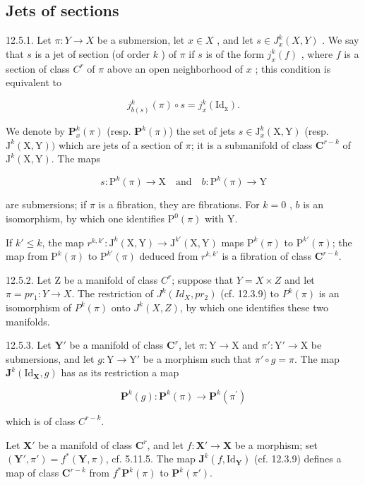 \subsection{Jets of sections}

12.5.1. Let \(\pi: Y \to X\) be a submersion, let \(x \in X\) , and let \(s \in J_x^k(X, Y)\) . We say that \(s\) is a jet of section (of order \(k\) ) of \(\pi\) if \(s\) is of the form \(j_x^k(f)\) , where \(f\) is a section of class \(C^r\) of \(\pi\) above an open neighborhood of \(x\) ; this condition is equivalent to

\[
j _ {b (s)} ^ {k} (\pi) \circ s = j _ {x} ^ {k} (\mathrm{Id} _ {\mathrm{x}}).
\]

We denote by \(\mathbf{P}_x^k (\pi)\) (resp. \(\mathbf{P}^k (\pi)\)) the set of jets \(s\in \mathrm{J}_x^k (\mathrm{X},\mathrm{Y})\) (resp. \(\mathrm{J}^k (\mathrm{X},\mathrm{Y}))\) which are jets of a section of \(\pi\); it is a submanifold of class \(\mathbf{C}^{r - k}\) of \(\mathrm{J}^k (\mathrm{X},\mathrm{Y})\). The maps

\[
s \colon \mathrm{P} ^ {k} (\pi) \rightarrow \mathrm{X} \quad \text {and} \quad b \colon \mathrm{P} ^ {k} (\pi) \rightarrow \mathrm{Y}
\]

are submersions; if \(\pi\) is a fibration, they are fibrations. For \(k=0\) , \(b\) is an isomorphism, by which one identifies \(\mathrm{P}^{0}(\pi)\) with Y.

If \(k' \leqslant k\), the map \(r^{k, k'} : \mathrm{J}^k(\mathrm{X}, \mathrm{Y}) \to \mathrm{J}^{k'}(\mathrm{X}, \mathrm{Y})\) maps \(\mathrm{P}^k(\pi)\) to \(\mathrm{P}^{k'}(\pi)\); the map from \(\mathrm{P}^k(\pi)\) to \(\mathrm{P}^{k'}(\pi)\) deduced from \(r^{k, k'}\) is a fibration of class \(\mathbf{C}^{r-k}\).

12.5.2. Let Z be a manifold of class \(C^{r}\); suppose that \(Y = X \times Z\) and let \(\pi = pr_{1}: Y \to X\). The restriction of \(J^{k}(Id_{X}, pr_{2})\) (cf. 12.3.9) to \(P^{k}(\pi)\) is an isomorphism of \(P^{k}(\pi)\) onto \(J^{k}(X, Z)\), by which one identifies these two manifolds.

12.5.3. Let \(\mathbf{Y}'\) be a manifold of class \(\mathbf{C}^{r}\), let \(\pi: \mathrm{Y} \to \mathrm{X}\) and \(\pi': \mathrm{Y}' \to \mathrm{X}\) be submersions, and let \(g: \mathrm{Y} \to \mathrm{Y}'\) be a morphism such that \(\pi' \circ g = \pi\). The map \(\mathbf{J}^{k}(\mathrm{Id}_{\mathbf{X}},g)\) has as its restriction a map

\[
\mathbf {P} ^ {k} (g) \colon \mathbf {P} ^ {k} (\pi) \to \mathbf {P} ^ {k} (\pi^ {\prime})
\]

which is of class \(C^{r-k}\).

Let \(\mathbf{X}'\) be a manifold of class \(\mathbf{C}^r\), and let \(f: \mathbf{X}' \to \mathbf{X}\) be a morphism; set \((\mathbf{Y}', \pi') = f^*(\mathbf{Y}, \pi)\), cf. 5.11.5. The map \(\mathbf{J}^k(f, \mathrm{Id}_\mathbf{Y})\) (cf. 12.3.9) defines a map of class \(\mathbf{C}^{r-k}\) from \(f^*\mathbf{P}^k(\pi)\) to \(\mathbf{P}^k(\pi')\).

